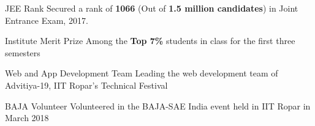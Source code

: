 
\begin{misc}


\cvskill
    {JEE Rank} %
    {{Secured a rank of }\textbf{1066} { (Out of \textbf{1.5 million candidates}) }{in Joint Entrance Exam, 2017.}}
 
\cvskill
    {Institute Merit Prize} %
    {{Among the \textbf{Top 7\%} students in class for the first three semesters}}
 

    \cvskill
    {Web and App Development Team} %
    {{Leading the web development team of Advitiya-19, IIT Ropar's Technical Festival}}

\cvskill
    {BAJA Volunteer} %
    {{Volunteered in the BAJA-SAE India event held in IIT Ropar in March 2018}}



\end{misc}
